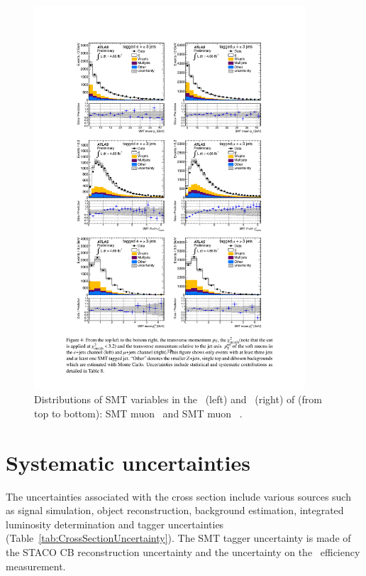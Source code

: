 \begin{figure}[htbp]
  \centering
    \includegraphics[width=0.90\textwidth]{PartCrossSection/Plots/h_stacks_elmu_SMT_pars.pdf}
    \caption[Distributions of SMT variables in the \ejets\ (left) and \mujets\ (right) of (from top to bottom): SMT muon \pt\ and SMT muon \xsd.]{Distributions of SMT variables in the \ejets\ (left) and \mujets\ (right) of (from top to bottom): SMT muon \pt\ and SMT muon \xsd~\cite{Cross:SMTCrossSectionPaper}.}\label{fig:CrossBackgroundSMTShapes}
\end{figure}


\section{Systematic uncertainties}\label{sec:systematics_uncertainties}

The uncertainties associated with the cross section include various sources such as signal simulation, object reconstruction, background estimation, integrated luminosity determination and tagger uncertainties (Table~\ref{tab:CrossSectionUncertainty}). The SMT tagger uncertainty is made of the STACO CB reconstruction uncertainty and the uncertainty on the \xsm\ efficiency measurement. 

